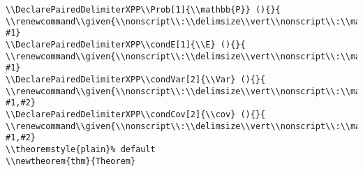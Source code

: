 \documentclass[c]{article}
\DeclareMathOperator{\Var}{Var}
\DeclareMathOperator{\cov}{Cov}
\DeclareMathOperator{\E}{\mathbb{E}}
\providecommand\given{}
\renewcommand\given{\nonscript\:\delimsize\vert\nonscript\:\mathopen{}}
\renewcommand\given{\nonscript\:\delimsize\vert\nonscript\:\mathopen{}}
\renewcommand\given{\nonscript\:\delimsize\vert\nonscript\:\mathopen{}}
\renewcommand\given{\nonscript\:\delimsize\vert\nonscript\:\mathopen{}}
\theoremstyle{plain}%
\theoremstyle{definition}
\theoremstyle{remark}
\begin{document}
\begin{verbatim}
\\DeclarePairedDelimiterXPP\\Prob[1]{\\mathbb{P}} (){}{
\\renewcommand\\given{\\nonscript\\:\\delimsize\\vert\\nonscript\\:\\mathopen{}}
#1}
\\DeclarePairedDelimiterXPP\\condE[1]{\\E} (){}{
\\renewcommand\\given{\\nonscript\\:\\delimsize\\vert\\nonscript\\:\\mathopen{}}
#1}
\\DeclarePairedDelimiterXPP\\condVar[2]{\\Var} (){}{
\\renewcommand\\given{\\nonscript\\:\\delimsize\\vert\\nonscript\\:\\mathopen{}}
#1,#2}
\\DeclarePairedDelimiterXPP\\condCov[2]{\\cov} (){}{
\\renewcommand\\given{\\nonscript\\:\\delimsize\\vert\\nonscript\\:\\mathopen{}}
#1,#2}
\\theoremstyle{plain}% default
\\newtheorem{thm}{Theorem}

\end{verbatim}
\end{document}
